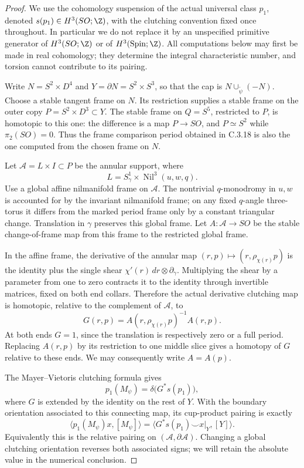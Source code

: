 \begin{proof}
We use the cohomology suspension of the actual universal class
$p_1$, denoted $s(p_1)\in H^3(SO;\Z)$, with the clutching
convention fixed once throughout. In particular we do not
replace it by an unspecified primitive generator of
$H^3(SO;\Z)$ or of $H^3(\operatorname{Spin};\Z)$.
All computations below may first be made in real cohomology;
they determine the integral characteristic number, and torsion
cannot contribute to its pairing.

Write $N=S^2\times D^4$ and $Y=\partial N=S^2\times S^3$,
so that the cap is $N\cup_{\widetilde\psi}(-N)$. Choose a
stable tangent frame on $N$. Its restriction supplies a stable
frame on the outer copy $P=S^2\times D^3\subset Y$. The
stable frame on $Q=S^5$, restricted to $P$, is homotopic to
this one: the difference is a map $P\to SO$, and
$P\simeq S^2$ while $\pi_2(SO)=0$. Thus the frame comparison
period obtained in C.3.18 is also the one computed from the
chosen frame on $N$.

Let $\mathcal A=L\times I\subset P$ be the annular support,
where
\[
 L=S^1_\gamma\times\operatorname{Nil}^3(u,w,q).
\]
Use a global affine nilmanifold frame on $\mathcal A$.
The nontrivial $q$-monodromy in $u,w$ is accounted for by
the invariant nilmanifold frame; on any fixed $q$-angle
three-torus it differs from the marked period frame only
by a constant triangular change. Translation in $\gamma$
preserves this global frame. Let
$A:\mathcal A\to SO$ be the stable change-of-frame map
from this frame to the restricted global frame.

In the affine frame, the derivative of the annular map
$(r,p)\mapsto(r,\rho_{\chi(r)}p)$ is the identity plus
the single shear $\chi'(r)\,dr\otimes\partial_\gamma$.
Multiplying the shear by a parameter from one to zero
contracts it to the identity through invertible matrices,
fixed on both end collars. Therefore the actual derivative
clutching map is homotopic, relative to the complement of
$\mathcal A$, to
\[
 G(r,p)=A(r,\rho_{\chi(r)}p)^{-1}A(r,p).
\]
At both ends $G=1$, since the translation is respectively
zero or a full period. Replacing $A(r,p)$ by its restriction
to one middle slice gives a homotopy of $G$ relative to
these ends. We may consequently write $A=A(p)$.

The Mayer--Vietoris clutching formula gives
\[
 p_1(M_\psi)=\delta\bigl(G^*s(p_1)\bigr),
\]
where $G$ is extended by the identity on the rest of $Y$.
With the boundary orientation associated to this connecting
map, its cup-product pairing is exactly
\[
 \langle p_1(M_\psi)x,[M_\psi]\rangle
 =\langle G^*s(p_1)\smile x|_Y,[Y]\rangle.
\]
Equivalently this is the relative pairing on
$(\mathcal A,\partial\mathcal A)$. Changing a global
clutching orientation reverses both associated signs;
we will retain the absolute value in the numerical conclusion.


\end{proof}
